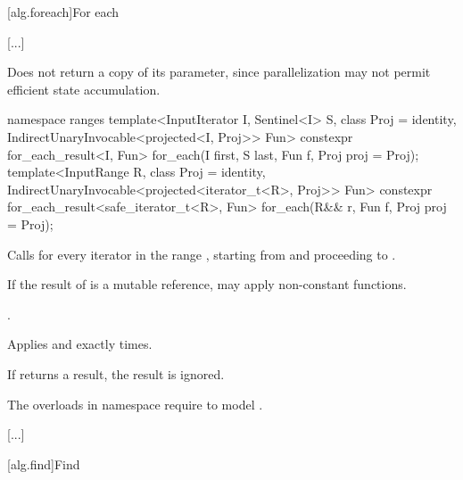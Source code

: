 [alg.foreach]{For each}

[...]

\setcounter{Paras}{9}
\begin{itemdescr}
\pnum
\begin{note}
Does not return a copy of its  parameter, since
parallelization may not permit efficient state accumulation.
\end{note}
\end{itemdescr}

\begin{addedblock}
%
\begin{itemdecl}
namespace ranges {
  template<InputIterator I, Sentinel<I> S, class Proj = identity,
      IndirectUnaryInvocable<projected<I, Proj>> Fun>
    constexpr for_each_result<I, Fun>
      for_each(I first, S last, Fun f, Proj proj = Proj{});
  template<InputRange R, class Proj = identity,
      IndirectUnaryInvocable<projected<iterator_t<R>, Proj>> Fun>
    constexpr for_each_result<safe_iterator_t<R>, Fun>
      for_each(R&& r, Fun f, Proj proj = Proj{});
}
\end{itemdecl}

\begin{itemdescr}
\pnum
\effects
Calls
 for every iterator
 in the range
,
starting from
and proceeding to
.
\begin{note}
If the result of
 is a mutable reference,  may apply
non-constant functions.
\end{note}

\pnum
\returns
{}.

\pnum
\complexity
Applies  and 
exactly
times.

\pnum
\remarks
If  returns a result, the result is ignored.

\pnum
\begin{note}
The overloads in namespace  require  to model
.
\end{note}
\end{itemdescr}
\end{addedblock}

[...]

[alg.find]{Find}

